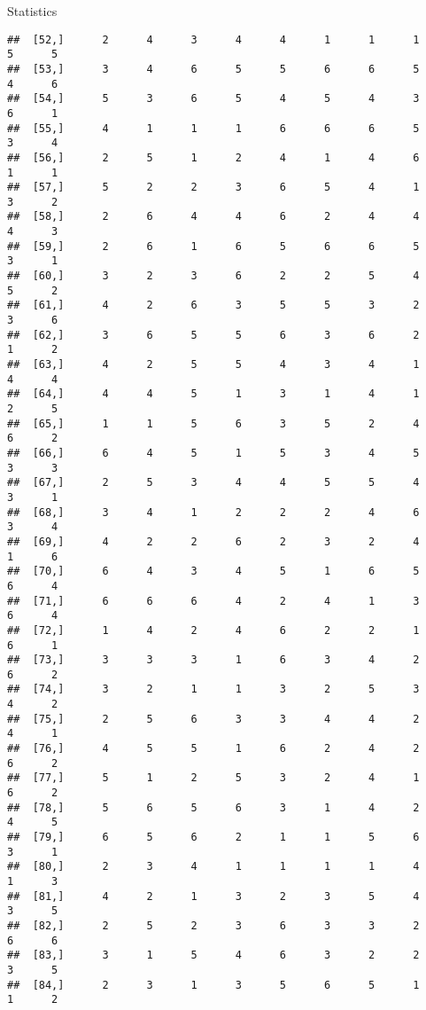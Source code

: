 \documentclass[
  ignorenonframetext,
]{beamer}
\begin{document}
\begin{frame}[fragile]{Statistics}
\begin{verbatim}
##  [52,]      2      4      3      4      4      1      1      1      5      5
##  [53,]      3      4      6      5      5      6      6      5      4      6
##  [54,]      5      3      6      5      4      5      4      3      6      1
##  [55,]      4      1      1      1      6      6      6      5      3      4
##  [56,]      2      5      1      2      4      1      4      6      1      1
##  [57,]      5      2      2      3      6      5      4      1      3      2
##  [58,]      2      6      4      4      6      2      4      4      4      3
##  [59,]      2      6      1      6      5      6      6      5      3      1
##  [60,]      3      2      3      6      2      2      5      4      5      2
##  [61,]      4      2      6      3      5      5      3      2      3      6
##  [62,]      3      6      5      5      6      3      6      2      1      2
##  [63,]      4      2      5      5      4      3      4      1      4      4
##  [64,]      4      4      5      1      3      1      4      1      2      5
##  [65,]      1      1      5      6      3      5      2      4      6      2
##  [66,]      6      4      5      1      5      3      4      5      3      3
##  [67,]      2      5      3      4      4      5      5      4      3      1
##  [68,]      3      4      1      2      2      2      4      6      3      4
##  [69,]      4      2      2      6      2      3      2      4      1      6
##  [70,]      6      4      3      4      5      1      6      5      6      4
##  [71,]      6      6      6      4      2      4      1      3      6      4
##  [72,]      1      4      2      4      6      2      2      1      6      1
##  [73,]      3      3      3      1      6      3      4      2      6      2
##  [74,]      3      2      1      1      3      2      5      3      4      2
##  [75,]      2      5      6      3      3      4      4      2      4      1
##  [76,]      4      5      5      1      6      2      4      2      6      2
##  [77,]      5      1      2      5      3      2      4      1      6      2
##  [78,]      5      6      5      6      3      1      4      2      4      5
##  [79,]      6      5      6      2      1      1      5      6      3      1
##  [80,]      2      3      4      1      1      1      1      4      1      3
##  [81,]      4      2      1      3      2      3      5      4      3      5
##  [82,]      2      5      2      3      6      3      3      2      6      6
##  [83,]      3      1      5      4      6      3      2      2      3      5
##  [84,]      2      3      1      3      5      6      5      1      1      2

\end{verbatim}
\end{frame}
\end{document}
